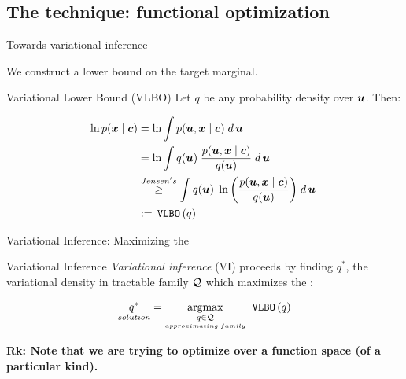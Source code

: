 \documentclass[10pt]{beamer}
\begin{document}
%

\subsection{The technique: functional optimization}
\begin{frame}{Towards variational inference}
 

We construct a lower bound on the target marginal. 



\begin{block}{Variational Lower Bound (VLBO)}
Let $q$ be any probability density over ${\boldsymbol u}$. Then:

\begin{align*}
\ln p({\boldsymbol x} \; | \; {\boldsymbol c}) & = \ln \displaystyle\int  p({\boldsymbol u}, {\boldsymbol x}  \; | \; {\boldsymbol c}) \; d \,{{\boldsymbol u}} \;  \\ 
& = \ln \displaystyle\int  q({\boldsymbol u}) \; \displaystyle\frac{p({\boldsymbol u}, {\boldsymbol x}  \; | \; {\boldsymbol c} )}{q({\boldsymbol u})} \; d \,{{\boldsymbol u}} \;  \\ 
& \stackrel{Jensen's}{\geq} \displaystyle\int  q({\boldsymbol u}) \; \ln \bigg( \displaystyle\frac{p({\boldsymbol u}, {\boldsymbol x}  \; | \; {\boldsymbol c})}{q({\boldsymbol u})} \bigg) \; d \,{{\boldsymbol u}} \; \\
& : = \,\texttt{VLBO}\,(q) 
\end{align*}
\end{block} 

 


\end{frame} 
%
%
\begin{frame}{Variational Inference: Maximizing the 
\VLBO}


\begin{block}{Variational Inference}
\textit{Variational inference} (VI) proceeds by finding $q^*$, the variational density in tractable family $\mathcal{Q}$ which maximizes the \VLBO :

\[ \underset{solution}{q^*} = \operatorname*{argmax}_{\underset{approximating \; family}{q \in \mathcal{Q}}} \; \,\texttt{VLBO}\, ( q) \]
\end{block} 


\vfill \vfill
\tiny \bf{Rk:} Note that we are trying to optimize over a function space (of a particular kind).  
\end{frame} 
\end{document}
